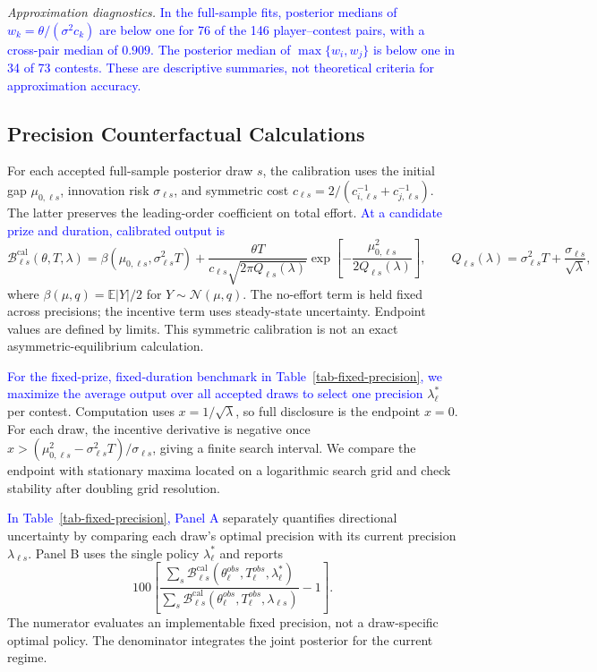 \documentclass[mnsc]{informs3}
\begin{document}
\begin{APPENDICES}
{\textit{Approximation diagnostics.}} \textcolor{blue}{In the full-sample fits, posterior medians of $w_k=\theta/(\sigma^2c_k)$ are below one for 76 of the 146 player--contest pairs, with a cross-pair median of $0.909$. The posterior median of $\max\{w_i,w_j\}$ is below one in 34 of 73 contests. These are descriptive summaries, not theoretical criteria for approximation accuracy.}

\subsection{Precision Counterfactual Calculations}\label{app-precision-counterfactual}

{For each accepted full-sample posterior draw $s$, the calibration uses the initial gap $\mu_{0,\ell s}$, innovation risk $\sigma_{\ell s}$, and symmetric cost $c_{\ell s}=2/(c_{i,\ell s}^{-1}+c_{j,\ell s}^{-1})$. The latter preserves the leading-order coefficient on total effort. \textcolor{blue}{At a candidate prize and duration, calibrated output is}
\[
\mathcal B_{\ell s}^{\mathrm{cal}}(\theta,T,\lambda)
=\beta(\mu_{0,\ell s},\sigma_{\ell s}^2T)
+\frac{\theta T}{c_{\ell s}\sqrt{2\pi Q_{\ell s}(\lambda)}}
\exp\!\left[-\frac{\mu_{0,\ell s}^2}{2Q_{\ell s}(\lambda)}\right],
\qquad Q_{\ell s}(\lambda)=\sigma_{\ell s}^2T+\frac{\sigma_{\ell s}}{\sqrt\lambda},
\]
where $\beta(\mu,q)=\mathbb E|Y|/2$ for $Y\sim\mathcal N(\mu,q)$. The no-effort term is held fixed across precisions; the incentive term uses steady-state uncertainty. Endpoint values are defined by limits. This symmetric calibration is not an exact asymmetric-equilibrium calculation.

\textcolor{blue}{For the fixed-prize, fixed-duration benchmark in Table~\ref{tab-fixed-precision}, we maximize the average output over all accepted draws to select one precision} $\lambda_\ell^*$ per contest. Computation uses $x=1/\sqrt\lambda$, so full disclosure is the endpoint $x=0$. For each draw, the incentive derivative is negative once $x>(\mu_{0,\ell s}^2-\sigma_{\ell s}^2T)/\sigma_{\ell s}$, giving a finite search interval. We compare the endpoint with stationary maxima located on a logarithmic search grid and check stability after doubling grid resolution.

\textcolor{blue}{In Table~\ref{tab-fixed-precision}, Panel A} separately quantifies directional uncertainty by comparing each draw's optimal precision with its current precision $\lambda_{\ell s}$. Panel B uses the single policy $\lambda_\ell^*$ and reports
\[
100\left[
\frac{\sum_s\mathcal B_{\ell s}^{\mathrm{cal}}(\theta_\ell^{obs},T_\ell^{obs},\lambda_\ell^*)}
{\sum_s\mathcal B_{\ell s}^{\mathrm{cal}}(\theta_\ell^{obs},T_\ell^{obs},\lambda_{\ell s})}
-1\right].
\]
The numerator evaluates an implementable fixed precision, not a draw-specific optimal policy. The denominator integrates the joint posterior for the current regime.}


\end{APPENDICES}
\end{document}
